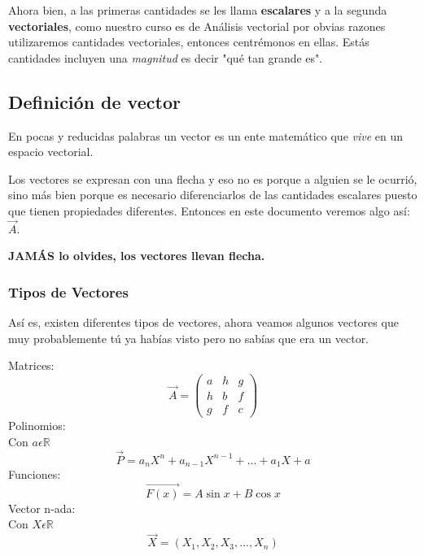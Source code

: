 \documentclass[12pt,openany]{book}
\begin{document}
	    Ahora bien, a las primeras cantidades se les llama \textbf{escalares} y a la
	    segunda \textbf{vectoriales}, como nuestro curso es de An\'alisis vectorial 
	    por obvias razones utilizaremos cantidades vectoriales, entonces centr\'emonos en ellas. 
	    Est\'as cantidades incluyen una \textsl{magnitud} es decir "qu\'e tan grande es".
	    		
	    \subsection{Definici\'on de vector}
	    En pocas y reducidas palabras un vector es un ente matem\'atico que \textsl{vive} 
	    en un espacio vectorial. 

		Los vectores se expresan con una flecha y eso no es porque a alguien se le 
	    ocurri\'o, sino m\'as bien porque es necesario diferenciarlos de las 
	    cantidades escalares puesto que tienen propiedades diferentes. Entonces
	    en este documento veremos algo as\'i: $\vec{A}$.
	    
	    \noindent \textbf{JAM\'AS lo olvides, los vectores llevan flecha.}  

		    \subsubsection{Tipos de Vectores}
		    As\'i es, existen diferentes tipos de vectores, ahora veamos algunos 
		    vectores que muy probablemente t\'u ya hab\'ias visto pero no sab\'ias
		    que era un vector.
		    
		    \noindent Matrices:
		        $$\vec{A}=
		        \left(
		            \begin{smallmatrix}
		            a & h & g\\
		            h & b & f\\
		            g & f & c
		            \end{smallmatrix}
		        \right)
		        $$
		   \noindent Polinomios:\\
		        Con $a \epsilon \mathbb{R}$
		        $$\vec{P}=
		        a_n X^n + a_{n-1} X^{n-1} + ... + a_1 X + a 
		        $$
		    \noindent Funciones:
		        $$\vec{F(x)}= A\sin{x} + B\cos{x}$$
		    \noindent Vector n-ada:\\
		        Con $X \epsilon \mathbb{R}$
		        $$\vec{X}=
		        (X_1, X_2, X_3,..., X_n)
		        $$
		
\end{document}
